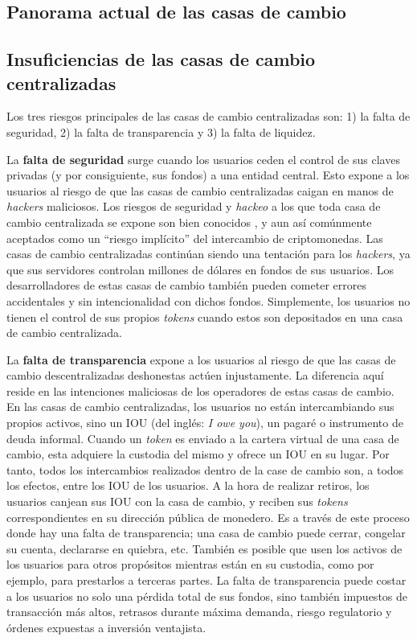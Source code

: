 \documentclass[UTF8,nofonts]{article}
\begin{document}
\begin{multicols}{2}
\section{Panorama actual de las casas de cambio\label{sec:current_exchange_landscape}}

\subsection{Insuficiencias de las casas de cambio centralizadas}
Los tres riesgos principales de las casas de cambio centralizadas son: 1) la falta de seguridad, 2) la falta de transparencia y 3) la falta de liquidez.

La \textbf{falta de seguridad} surge cuando los usuarios ceden el control de sus claves privadas (y por consiguiente, sus fondos) a una entidad central. Esto expone a los usuarios al riesgo de que las casas de cambio centralizadas caigan en manos de \textit{hackers} maliciosos. Los riesgos de seguridad y \textit{hackeo} a los que toda casa de cambio centralizada se expone son bien conocidos \cite{coincheckhack}  \cite{mcmillan2014inside}, y aun así comúnmente aceptados como un \enquote{riesgo implícito} del intercambio de criptomonedas. Las casas de cambio centralizadas continúan siendo una tentación para los \textit{hackers}, ya que sus servidores controlan millones de dólares en fondos de sus usuarios. Los desarrolladores de estas casas de cambio también pueden cometer errores accidentales y sin intencionalidad con dichos fondos. Simplemente, los usuarios no tienen el control de sus propios \textit{tokens} cuando estos son depositados en una casa de cambio centralizada.

La \textbf{falta de transparencia} expone a los usuarios al riesgo de que las casas de cambio descentralizadas deshonestas actúen injustamente. La diferencia aquí reside en las intenciones maliciosas de los operadores de estas casas de cambio. En las casas de cambio centralizadas, los usuarios no están intercambiando sus propios activos, sino un IOU (del inglés: \textit{I owe you}), un pagaré o instrumento de deuda informal. Cuando un \textit{token} es enviado a la cartera virtual de una casa de cambio, esta adquiere la custodia del mismo y ofrece un IOU en su lugar. Por tanto, todos los intercambios realizados dentro de la case de cambio son, a todos los efectos, entre los IOU de los usuarios. A la hora de realizar retiros, los usuarios canjean sus IOU con la casa de cambio, y reciben sus \textit{tokens} correspondientes en su dirección pública de monedero. Es a través de este proceso donde hay una falta de transparencia; una casa de cambio puede cerrar, congelar su cuenta, declararse en quiebra, etc. También es posible que usen los activos de los usuarios para otros propósitos mientras están en su custodia, como por ejemplo, para prestarlos a terceras partes. La falta de transparencia puede costar a los usuarios no solo una pérdida total de sus fondos, sino también impuestos de transacción más altos, retrasos durante máxima demanda, riesgo regulatorio y órdenes expuestas a inversión ventajista.


\end{multicols}
\end{document}
